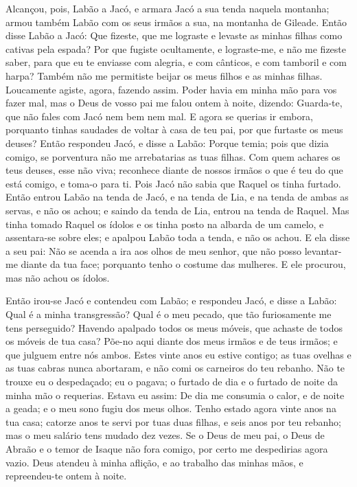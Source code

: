 Alcançou, pois, Labão a Jacó, e armara Jacó a sua tenda naquela
montanha; armou também Labão com os seus irmãos a sua, na montanha
de Gileade. Então disse Labão a Jacó: Que fizeste, que me
lograste e levaste as minhas filhas como cativas pela espada?
Por que fugiste ocultamente, e lograste-me, e não me fizeste
saber, para que eu te enviasse com alegria, e com cânticos, e com
tamboril e com harpa? Também não me permitiste beijar os meus
filhos e as minhas filhas. Loucamente agiste, agora, fazendo assim.
Poder havia em minha mão para vos fazer mal, mas o Deus de
vosso pai me falou ontem à noite, dizendo: Guarda-te, que não fales
com Jacó nem bem nem mal. E agora se querias ir embora,
porquanto tinhas saudades de voltar à casa de teu pai, por que
furtaste os meus deuses? Então respondeu Jacó, e disse a
Labão: Porque temia; pois que dizia comigo, se porventura não me
arrebatarias as tuas filhas. Com quem achares os teus deuses,
esse não viva; reconhece diante de nossos irmãos o que é teu do que
está comigo, e toma-o para ti. Pois Jacó não sabia que Raquel os
tinha furtado. Então entrou Labão na tenda de Jacó, e na
tenda de Lia, e na tenda de ambas as servas, e não os achou; e
saindo da tenda de Lia, entrou na tenda de Raquel. Mas tinha
tomado Raquel os ídolos e os tinha posto na albarda de um camelo, e
assentara-se sobre eles; e apalpou Labão toda a tenda, e não os
achou. E ela disse a seu pai: Não se acenda a ira aos olhos
de meu senhor, que não posso levantar-me diante da tua face;
porquanto tenho o costume das mulheres. E ele procurou, mas não
achou os ídolos.

Então irou-se Jacó e contendeu com Labão; e respondeu Jacó, e
disse a Labão: Qual é a minha transgressão? Qual é o meu pecado, que
tão furiosamente me tens perseguido? Havendo apalpado todos
os meus móveis, que achaste de todos os móveis de tua casa? Põe-no
aqui diante dos meus irmãos e de teus irmãos; e que julguem entre
nós ambos. Estes vinte anos eu estive contigo; as tuas
ovelhas e as tuas cabras nunca abortaram, e não comi os carneiros do
teu rebanho. Não te trouxe eu o despedaçado; eu o pagava; o
furtado de dia e o furtado de noite da minha mão o requerias.
Estava eu assim: De dia me consumia o calor, e de noite a
geada; e o meu sono fugiu dos meus olhos. Tenho estado agora
vinte anos na tua casa; catorze anos te servi por tuas duas filhas,
e seis anos por teu rebanho; mas o meu salário tens mudado dez
vezes. Se o Deus de meu pai, o Deus de Abraão e o temor de
Isaque não fora comigo, por certo me despedirias agora vazio. Deus
atendeu à minha aflição, e ao trabalho das minhas mãos, e
repreendeu-te ontem à noite.


